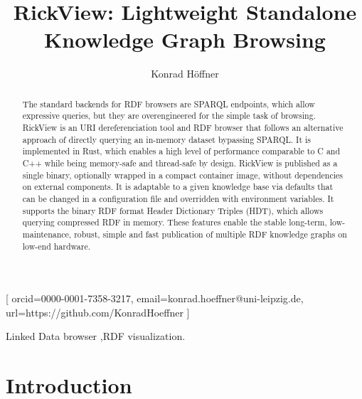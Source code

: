\documentclass{ceurart}
\begin{document}
\title{RickView: Lightweight Standalone Knowledge Graph Browsing}
\author[1]{Konrad Höffner}[%
orcid=0000-0001-7358-3217,
email=konrad.hoeffner@uni-leipzig.de,
url=https://github.com/KonradHoeffner
]
\cormark[1]
\fnmark[1]
\address[1]{Institute for Medical Informatics, Statistics and Epidemiology (IMISE), Leipzig University, Leipzig, Germany}


%
\begin{abstract}
The standard backends for RDF browsers are SPARQL endpoints, which allow expressive queries, but they are overengineered for the simple task of browsing.
RickView is an URI dereferenciation tool and RDF browser that follows an alternative approach of directly querying an in-memory dataset bypassing SPARQL.
It is implemented in Rust, which enables a high level of performance comparable to C and C++ while being memory-safe and thread-safe by design.
RickView is published as a single binary, optionally wrapped in a compact container image, without dependencies on external components.
It is adaptable to a given knowledge base via defaults that can be changed in a configuration file and overridden with environment variables.
It supports the binary RDF format Header Dictionary Triples (HDT), which allows querying compressed RDF in memory.
These features enable the stable long-term, low-maintenance, robust, simple and fast publication of multiple RDF knowledge graphs on low-end hardware.
\end{abstract}
\begin{keywords}Linked Data browser \sep RDF visualization.\end{keywords}

\maketitle

\section{Introduction}\label{summary}
\end{document}
